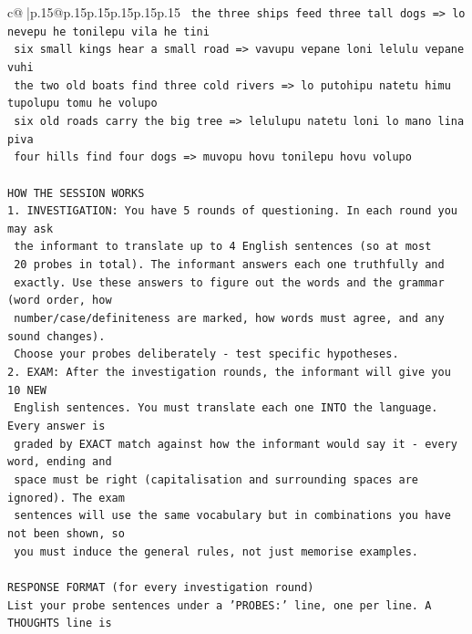 \documentclass{article}
\begin{document}
{\begin{supertabular}{c@{$\;$}|p{.15\linewidth}@{}p{.15\linewidth}p{.15\linewidth}p{.15\linewidth}p{.15\linewidth}p{.15\linewidth}}
{{{\texttt{    the three ships feed three tall dogs  =>  lo nevepu he tonilepu vila he tini} \\
\texttt{    six small kings hear a small road  =>  vavupu vepane loni lelulu vepane vuhi} \\
\texttt{    the two old boats find three cold rivers  =>  lo putohipu natetu himu tupolupu tomu he volupo} \\
\texttt{    six old roads carry the big tree  =>  lelulupu natetu loni lo mano lina piva} \\
\texttt{    four hills find four dogs  =>  muvopu hovu tonilepu hovu volupo} \\
\\ 
\texttt{HOW THE SESSION WORKS} \\
\texttt{1. INVESTIGATION: You have 5 rounds of questioning. In each round you may ask} \\
\texttt{   the informant to translate up to 4 English sentences (so at most} \\
\texttt{   20 probes in total). The informant answers each one truthfully and} \\
\texttt{   exactly. Use these answers to figure out the words and the grammar (word order, how} \\
\texttt{   number/case/definiteness are marked, how words must agree, and any sound changes).} \\
\texttt{   Choose your probes deliberately {-} test specific hypotheses.} \\
\texttt{2. EXAM: After the investigation rounds, the informant will give you 10 NEW} \\
\texttt{   English sentences. You must translate each one INTO the language. Every answer is} \\
\texttt{   graded by EXACT match against how the informant would say it {-} every word, ending and} \\
\texttt{   space must be right (capitalisation and surrounding spaces are ignored). The exam} \\
\texttt{   sentences will use the same vocabulary but in combinations you have not been shown, so} \\
\texttt{   you must induce the general rules, not just memorise examples.} \\
\\ 
\texttt{RESPONSE FORMAT (for every investigation round)} \\
\texttt{List your probe sentences under a 'PROBES:' line, one per line. A THOUGHTS line is} \\
}}}
\end{supertabular}}
\end{document}
